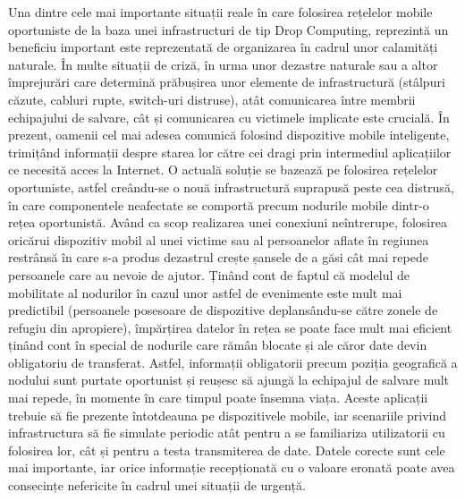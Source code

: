 \documentclass[12pt,a4paper]{report}
\begin{document}
Una dintre cele mai importante situații reale în care folosirea rețelelor mobile oportuniste de la baza unei infrastructuri de tip Drop Computing, reprezintă un beneficiu important este reprezentată de organizarea în cadrul unor calamități naturale. În multe situații de criză, în urma unor dezastre naturale sau a altor împrejurări care determină prăbușirea unor elemente de infrastructură (stâlpuri căzute, cabluri rupte, switch-uri distruse), atât comunicarea între membrii echipajului de salvare, cât și comunicarea cu victimele implicate este crucială. În prezent, oamenii cel mai adesea comunică folosind dispozitive mobile inteligente, trimițând informații despre starea lor către cei dragi prin intermediul aplicațiilor ce necesită acces la Internet. O actuală soluție se bazează pe folosirea rețelelor oportuniste, astfel creându-se o nouă infrastructură suprapusă peste cea distrusă, în care componentele neafectate se comportă precum nodurile mobile dintr-o rețea oportunistă. Având ca scop realizarea unei conexiuni neîntrerupe, folosirea oricărui dispozitiv mobil al unei victime sau al persoanelor aflate în regiunea restrânsă în care s-a produs dezastrul crește șansele de a găsi cât mai repede persoanele care au nevoie de ajutor. Ținând cont de faptul că modelul de mobilitate al nodurilor în cazul unor astfel de evenimente este mult mai predictibil (persoanele posesoare de dispozitive deplansându-se către zonele de refugiu din apropiere), împărțirea datelor în rețea se poate face mult mai eficient ținând cont în special de nodurile care rămân blocate și ale căror date devin obligatoriu de transferat. Astfel, informații obligatorii precum poziția geografică a nodului sunt purtate oportunist și reușesc să ajungă la echipajul de salvare mult mai repede, în momente în care timpul poate însemna viața. Aceste aplicații trebuie să fie prezente întotdeauna pe dispozitivele mobile, iar scenariile privind infrastructura să fie simulate periodic atât pentru a se familiariza utilizatorii cu folosirea lor, cât și pentru a testa transmiterea de date. Datele corecte sunt cele mai importante, iar orice informație recepționată cu o valoare eronată poate avea consecințe nefericite în cadrul unei situații de urgență.
\end{document}
